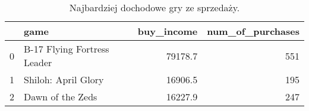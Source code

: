 \begin{table}[h]
\centering
\caption{Najbardziej dochodowe gry ze sprzedaży.}\label{tab:purchases}
\begin{tabular}{rlrr}
\hline
    & game                        &   buy\_income &   num\_of\_purchases \\
\hline
  0 & B-17 Flying Fortress Leader &      79178.7 &                551 \\
  1 & Shiloh: April Glory         &      16906.5 &                195 \\
  2 & Dawn of the Zeds            &      16227.9 &                247 \\
\hline
\end{tabular}\end{table}